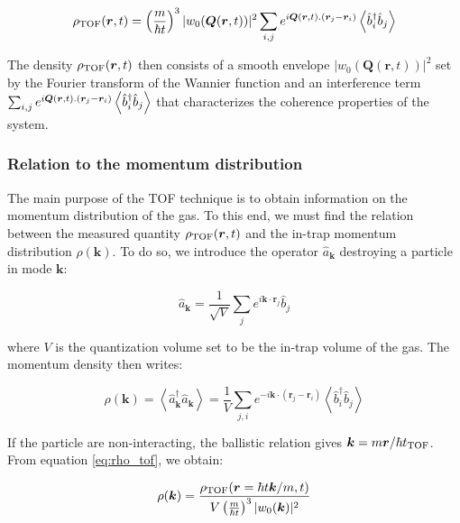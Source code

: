 \begin{equation}
    \rho_{\rm{TOF}}(\bm{r},t) = \left(\frac{m}{\hbar t} \right)^3 |w_0(\bm{Q}(\bm{r},t))|^2 \sum_{i,j} e^{i \bm{Q}(\bm{r},t).(\bm{r}_j - \bm{r}_{i})} \left\langle\hat{b}^{\dagger}_i \hat{b}_j \right\rangle
    \label{eq:rho_tof}
\end{equation}

\noindent The density $\rho_{\rm{TOF}}(\bm{r},t)$ then consists of a smooth envelope $|w_0(\bm{Q}(\bm{r},t))|^2$ set by the Fourier transform of the Wannier function and an interference term $\sum_{i,j} e^{i \bm{Q}(\bm{r},t).(\bm{r}_j - \bm{r}_{i})} \left\langle\hat{b}^{\dagger}_i \hat{b}_j \right\rangle$ that characterizes the coherence properties of the system. 

\subsubsection{Relation to the momentum distribution}

The main purpose of the TOF technique is to obtain information on the momentum distribution of the gas. To this end, we must find the relation between the measured quantity $\rho_{\rm{TOF}}(\bm{r},t)$ and the in-trap momentum distribution $\rho(\bm{k})$. To do so, we introduce the operator $\hat{a}_{\bm{k}}$ destroying a particle in mode $\bm{k}$:

\begin{equation}
    \hat{a}_{\bm{k}}=\frac{1}{\sqrt{V}} \sum_{j} e^{i \bm{k} \cdot \bm{r}_{j}} \hat{b}_{j}
\end{equation}

\noindent where $V$ is the quantization volume set to be the in-trap volume of the gas. The momentum density then writes:

\begin{equation}
    \rho(\bm{k})=\left\langle\hat{a}^{\dagger}_{\bm{k}} \hat{a}_{\bm{k}}\right\rangle=\frac{1}{V} \sum_{j, i} e^{-i \bm{k} \cdot\left(\bm{r}_{j}-\bm{r}_{i}\right)}\left\langle\hat{b}_{i}^{\dagger} \hat{b}_{j}\right\rangle
    \label{eq:momentum_distribution}
\end{equation}

\noindent If the particle are non-interacting, the ballistic relation gives $\bm{k} = m \bm{r}/\hbar t_{\rm{TOF}}$. From equation \ref{eq:rho_tof}, we obtain:

\begin{equation}
    \rho(\bm{k}) = \frac{\rho_{\rm{TOF}}(\bm{r}=\hbar t\bm{k}/m,t)}{V  \left(\frac{m}{\hbar t} \right)^3 |w_0(\bm{k})|^2}
\end{equation}

